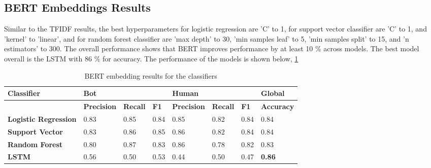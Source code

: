 \documentclass[12pt]{article}
\begin{document}
\subsection{BERT Embeddings Results}
Similar to the TFIDF results, the best hyperparameters for logistic regression are 'C'  to 1, for support vector classifier are 'C' to 1, and 'kernel' to 'linear', and for random forest classifier are 'max depth' to 30, 'min samples leaf' to 5, 'min samples split' to 15, and 'n estimators' to 300. The overall performance shows that BERT improves performance by at least 10 \% across models.  The best model overall is the LSTM with 86 \% for accuracy. The performance of the models is shown below, \ref{table:bert}
\begin{table}[ht]
\begin{tabular}{|l|lll|lll|l|}
\hline
\textbf{Classifier}          & \multicolumn{3}{l|}{\textbf{Bot	}}                                                          & \multicolumn{3}{l|}{\textbf{Human}}                                                            & \textbf{Global}   \\ \hline
\textbf{}                    & \multicolumn{1}{l|}{\textbf{Precision}} & \multicolumn{1}{l|}{\textbf{Recall}} & \textbf{F1} & \multicolumn{1}{l|}{\textbf{Precision}} & \multicolumn{1}{l|}{\textbf{Recall}} & \textbf{F1} & \textbf{Accuracy} \\ \hline
\textbf{Logistic Regression} & \multicolumn{1}{l|}{0.83}               & \multicolumn{1}{l|}{0.85}            & 0.84        & \multicolumn{1}{l|}{0.85}               & \multicolumn{1}{l|}{0.82}            & 0.84        & 0.84              \\ \hline
\textbf{Support Vector}      & \multicolumn{1}{l|}{0.83}               & \multicolumn{1}{l|}{0.86}            & 0.85        & \multicolumn{1}{l|}{0.86}               & \multicolumn{1}{l|}{0.82}            & 0.84        & 0.84              \\ \hline
\textbf{Random Forest}       & \multicolumn{1}{l|}{0.80}               & \multicolumn{1}{l|}{0.87}            & 0.83        & \multicolumn{1}{l|}{0.86}               & \multicolumn{1}{l|}{0.78}            & 0.82        & 0.83              \\ \hline
\textbf{LSTM}                & \multicolumn{1}{l|}{0.56}                   & \multicolumn{1}{l|}{0.50}                &0.53             & \multicolumn{1}{l|}{0.44}                   & \multicolumn{1}{l|}{0.50}                &0.47            & \textbf{0.86}              \\ \hline
\end{tabular}
\caption{BERT embedding results for the classifiers}
\label{table:bert}
\end{table}
\end{document}
